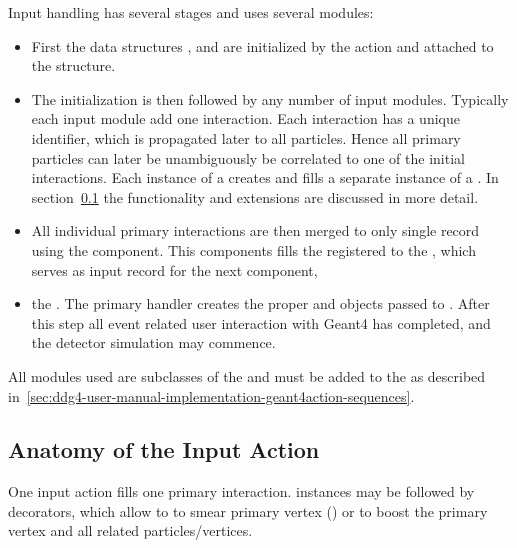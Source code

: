 \documentclass[10pt,a4paper]{article}
\begin{document}
\noindent
Input handling has several stages and uses several modules:
\begin{itemize}\itemcompact
\item First the data structures , 
     and \- are initialized 
    by the action  
    and attached to the {} structure.
\item The initialization is then followed by any number of input modules.
  Typically each input module add one interaction. Each interaction has a 
  unique identifier, which is propagated later to all particles. Hence all
  primary particles can later be unambiguously be correlated to one of the 
  initial interactions. 
  Each instance of a  creates and fills a separate instance
  of a .
  In section~\ref{sec:ddg4-implementation-geant4inputaction} the functionality and
  extensions are discussed in more detail.
\item All individual primary interactions are then merged to only single record
  using the \-\- component.
  This components fills the  registered to the
  , which serves as input record for the next component,
\item the . The primary handler creates the proper 
   and  objects passed to .
  After this step all event related user interaction with Geant4 has completed,
  and the detector simulation may commence.
\end{itemize}
All modules used are subclasses of the {\-\-} and must be
added to the \-\-\- as described 
in~\ref{sec:ddg4-user-manual-implementation-geant4action-sequences}.
\newpage

\subsection{Anatomy of the Input Action}
\label{sec:ddg4-implementation-geant4inputaction}

\newpage
One input action fills one primary interaction.
 instances may be followed by decorators, which 
allow to to smear primary vertex () or
to boost the primary vertex  and all 
related particles/vertices.
\end{document}
